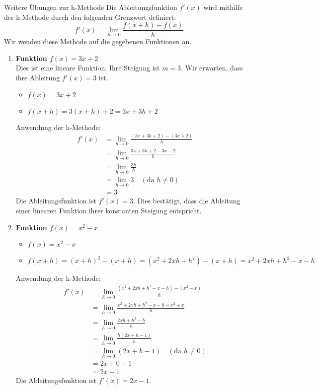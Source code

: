 \begin{loesungsumgebung}{Weitere Übungen zur h-Methode}
Die Ableitungsfunktion $f'(x)$ wird mithilfe der h-Methode durch den folgenden Grenzwert definiert:
$$ f'(x) = \lim_{h \to 0} \frac{f(x+h) - f(x)}{h} $$
Wir wenden diese Methode auf die gegebenen Funktionen an.

\begin{enumerate}[label=(\alph*)]
    \item \textbf{Funktion $f(x) = 3x + 2$} \\
    Dies ist eine lineare Funktion. Ihre Steigung ist $m=3$. Wir erwarten, dass ihre Ableitung $f'(x)=3$ ist.
    \begin{itemize}
        \item $f(x) = 3x + 2$
        \item $f(x+h) = 3(x+h) + 2 = 3x + 3h + 2$
    \end{itemize}
    Anwendung der h-Methode:
    \begin{align*}
    f'(x) &= \lim_{h \to 0} \frac{(3x + 3h + 2) - (3x + 2)}{h} \\
          &= \lim_{h \to 0} \frac{3x + 3h + 2 - 3x - 2}{h} \\
          &= \lim_{h \to 0} \frac{3h}{h} \\
          &= \lim_{h \to 0} 3 \quad (\text{da } h \neq 0) \\
          &= 3
    \end{align*}
    Die Ableitungsfunktion ist $f'(x) = 3$. Dies bestätigt, dass die Ableitung einer linearen Funktion ihrer konstanten Steigung entspricht.

    \item \textbf{Funktion $f(x) = x^2 - x$}
    \begin{itemize}
        \item $f(x) = x^2 - x$
        \item $f(x+h) = (x+h)^2 - (x+h) = (x^2 + 2xh + h^2) - (x+h) = x^2 + 2xh + h^2 - x - h$
    \end{itemize}
    Anwendung der h-Methode:
    \begin{align*}
    f'(x) &= \lim_{h \to 0} \frac{(x^2 + 2xh + h^2 - x - h) - (x^2 - x)}{h} \\
          &= \lim_{h \to 0} \frac{x^2 + 2xh + h^2 - x - h - x^2 + x}{h} \\
          &= \lim_{h \to 0} \frac{2xh + h^2 - h}{h} \\
          &= \lim_{h \to 0} \frac{h(2x + h - 1)}{h} \\
          &= \lim_{h \to 0} (2x + h - 1) \quad (\text{da } h \neq 0) \\
          &= 2x + 0 - 1 \\
          &= 2x - 1
    \end{align*}
    Die Ableitungsfunktion ist $f'(x) = 2x - 1$.


\end{enumerate}
\end{loesungsumgebung}
